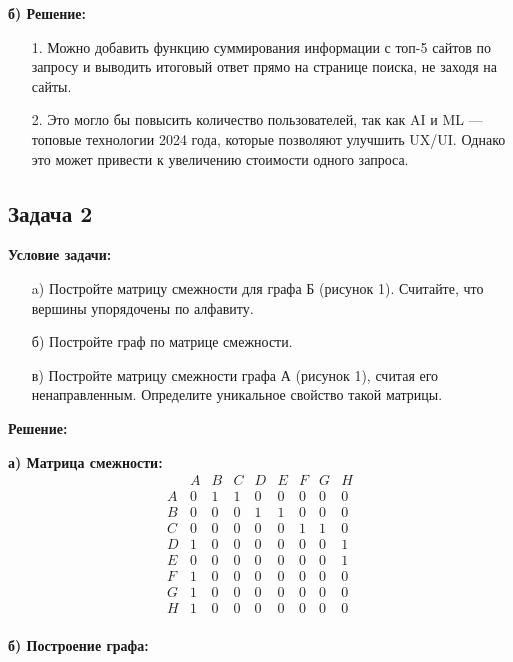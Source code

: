 \documentclass[a4paper,12pt]{article}
\begin{document}
\textbf{б) Решение:}
\begin{itemize}
    \item[1.] Можно добавить функцию суммирования информации с топ-5 сайтов по запросу и выводить итоговый ответ прямо на странице поиска, не заходя на сайты.
    \item[2.] Это могло бы повысить количество пользователей, так как AI и ML — топовые технологии 2024 года, которые позволяют улучшить UX/UI. Однако это может привести к увеличению стоимости одного запроса.
\end{itemize}

\vspace{1cm}

\subsection{Задача 2}
\textbf{Условие задачи:}
\begin{itemize}
    \item[a)] Постройте матрицу смежности для графа Б (рисунок 1). Считайте, что вершины упорядочены по алфавиту.
    \item[б)] Постройте граф по матрице смежности.
    \item[в)] Постройте матрицу смежности графа А (рисунок 1), считая его ненаправленным. Определите уникальное свойство такой матрицы.
\end{itemize}

\textbf{Решение:}

\textbf{а) Матрица смежности:}
\[
\begin{array}{c|cccccccc}
      & A & B & C & D & E & F & G & H \\ \hline
    A & 0 & 1 & 1 & 0 & 0 & 0 & 0 & 0 \\
    B & 0 & 0 & 0 & 1 & 1 & 0 & 0 & 0 \\
    C & 0 & 0 & 0 & 0 & 0 & 1 & 1 & 0 \\
    D & 1 & 0 & 0 & 0 & 0 & 0 & 0 & 1 \\
    E & 0 & 0 & 0 & 0 & 0 & 0 & 0 & 1 \\
    F & 1 & 0 & 0 & 0 & 0 & 0 & 0 & 0 \\
    G & 1 & 0 & 0 & 0 & 0 & 0 & 0 & 0 \\
    H & 1 & 0 & 0 & 0 & 0 & 0 & 0 & 0 \\
\end{array}
\]

\textbf{б) Построение графа:}
\end{document}
